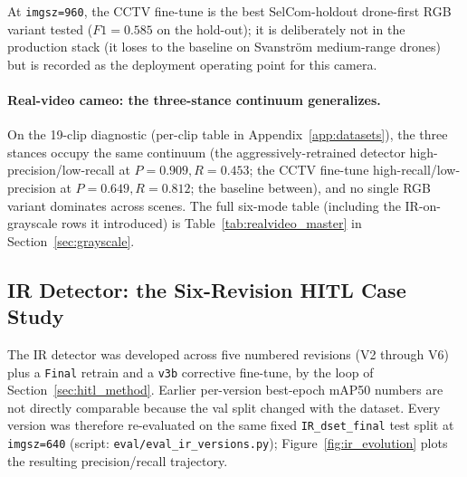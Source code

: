 At \texttt{imgsz=960}, the CCTV fine-tune is the best SelCom-holdout drone-first RGB variant tested ($F1=0.585$ on the hold-out); it is deliberately not in the production stack (it loses to the baseline on Svanstr\"om medium-range drones) but is recorded as the deployment operating point for this camera.

\paragraph{Real-video cameo: the three-stance continuum generalizes.}
On the 19-clip diagnostic (per-clip table in Appendix~\ref{app:datasets}), the three stances occupy the same continuum (the aggressively-retrained detector high-precision/low-recall at $P=0.909, R=0.453$; the CCTV fine-tune high-recall/low-precision at $P=0.649, R=0.812$; the baseline between), and no single RGB variant dominates across scenes. The full six-mode table (including the IR-on-grayscale rows it introduced) is Table~\ref{tab:realvideo_master} in Section~\ref{sec:grayscale}.

\subsection{IR Detector: the Six-Revision HITL Case Study}
\label{sec:ir_evolution}

The IR detector was developed across five numbered revisions (V2 through V6) plus a \texttt{Final} retrain and a \texttt{v3b} corrective fine-tune, by the loop of Section~\ref{sec:hitl_method}. Earlier per-version best-epoch mAP50 numbers are not directly comparable because the val split changed with the dataset. Every version was therefore re-evaluated on the same fixed \texttt{IR\_dset\_final} test split at \texttt{imgsz=640} (script: \texttt{eval/eval\_ir\_versions.py}); Figure~\ref{fig:ir_evolution} plots the resulting precision/recall trajectory.

